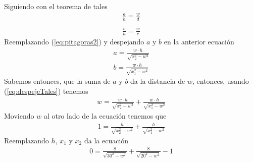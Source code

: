 \documentclass[ceqn,10pt]{SelfArx}
\begin{document}
Siguiendo con el teorema de tales
\begin{equation} \label{eq:tales}
\begin{aligned}
	\frac{a}{h} = \frac{w}{d}\\
	\\
	\frac{b}{h} = \frac{w}{c}
\end{aligned}
\end{equation}
Reemplazando (\ref{eq:pitagoras2}) y despejando $a$ y $b$ en la anterior ecuación
\begin{equation} \label{eq:despejeTales}
\begin{aligned}
	a = \frac{w \cdot h}{\sqrt{x_{2}^2-w^2}}\\
	b = \frac{w \cdot h}{\sqrt{x_{1}^2-w^2}}
\end{aligned}
\end{equation}
Sabemos entonces, que la suma de $a$ y $b$ da la distancia de $w$, entonces,
usando (\ref{eq:despejeTales}) tenemos
\begin{equation} \label{eq:obtenerW}
\begin{aligned}
	w = \frac{w \cdot h}{\sqrt{x_{2}^2-w^2}} + \frac{w \cdot h}{\sqrt{x_{1}^2-w^2}}
\end{aligned}
\end{equation}
Moviendo $w$ al otro lado de la ecuación tenemos que
\begin{equation} \label{eq:ecuacionW}
\begin{aligned}
	1 = \frac{h}{\sqrt{x_{2}^2-w^2}} + \frac{h}{\sqrt{x_{1}^2-w^2}}
\end{aligned}
\end{equation}
Reemplazando $h$, $x_{1}$ y $x_{2}$ da la ecuación
\begin{equation} \label{eq:despejeW}
\begin{aligned}
	0 = \frac{8}{\sqrt{30^2-w^2}} + \frac{8}{\sqrt{20^2-w^2}}-1
\end{aligned}
\end{equation}
\end{document}
